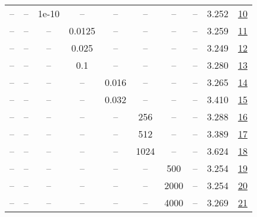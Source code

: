 \begin{table}[H]
\begin{tabular}{cccccccccc}
-- & -- & 1e-10 & -- & -- & -- & -- & -- & 3.252 & \href{https://wandb.ai/stanford-mercury/optimizer-scaling/runs/sweep-300m-6B-mars47d219lr0.008-wd0.1-minlr0-warmup1000-b10.98-b-193328}{10} \\
-- & -- & -- & 0.0125 & -- & -- & -- & -- & 3.259 & \href{https://wandb.ai/stanford-mercury/optimizer-scaling/runs/sweep-300m-6B-mars4c5abflr0.008-wd0.1-minlr0-warmup1000-b10.98-b-3e054b}{11} \\
-- & -- & -- & 0.025 & -- & -- & -- & -- & 3.249 & \href{https://wandb.ai/stanford-mercury/optimizer-scaling/runs/sweep-300m-6B-marsad66b2lr0.008-wd0.1-minlr0-warmup1000-b10.98-b-16d73c}{12} \\
-- & -- & -- & 0.1 & -- & -- & -- & -- & 3.280 & \href{https://wandb.ai/stanford-mercury/optimizer-scaling/runs/sweep-300m-6B-mars64d862lr0.008-wd0.1-minlr0-warmup1000-b10.98-b-546935}{13} \\
-- & -- & -- & -- & 0.016 & -- & -- & -- & 3.265 & \href{https://wandb.ai/stanford-mercury/optimizer-scaling/runs/sweep-300m-6B-marsdf5e3elr0.016-wd0.1-minlr0-warmup1000-b10.98-b-7afb74}{14} \\
-- & -- & -- & -- & 0.032 & -- & -- & -- & 3.410 & \href{https://wandb.ai/stanford-mercury/optimizer-scaling/runs/sweep-300m-6B-mars9fd6a9lr0.032-wd0.1-minlr0-warmup1000-b10.98-b-c5ffe2}{15} \\
-- & -- & -- & -- & -- & 256 & -- & -- & 3.288 & \href{https://wandb.ai/stanford-mercury/optimizer-scaling/runs/sweep-300m-6B-mars39cccclr0.008-wd0.1-minlr0-warmup1000-b10.98-b-2e238d}{16} \\
-- & -- & -- & -- & -- & 512 & -- & -- & 3.389 & \href{https://wandb.ai/stanford-mercury/optimizer-scaling/runs/sweep-300m-6B-mars4f583elr0.008-wd0.1-minlr0-warmup1000-b10.98-b-10ec54}{17} \\
-- & -- & -- & -- & -- & 1024 & -- & -- & 3.624 & \href{https://wandb.ai/stanford-mercury/optimizer-scaling/runs/sweep-300m-6B-marsfd212alr0.008-wd0.1-minlr0-warmup1000-b10.98-b-5c0926}{18} \\
-- & -- & -- & -- & -- & -- & 500 & -- & 3.254 & \href{https://wandb.ai/stanford-mercury/optimizer-scaling/runs/sweep-300m-6B-marsc7a1edlr0.008-wd0.1-minlr0-warmup500-b10.98-b2-3ac9c1}{19} \\
-- & -- & -- & -- & -- & -- & 2000 & -- & 3.254 & \href{https://wandb.ai/stanford-mercury/optimizer-scaling/runs/sweep-300m-6B-mars83418dlr0.008-wd0.1-minlr0-warmup2000-b10.98-b-e1073a}{20} \\
-- & -- & -- & -- & -- & -- & 4000 & -- & 3.269 & \href{https://wandb.ai/stanford-mercury/optimizer-scaling/runs/sweep-300m-6B-mars58d878lr0.008-wd0.1-minlr0-warmup4000-b10.98-b-032e46}{21} \\

\end{tabular}
\end{table}
